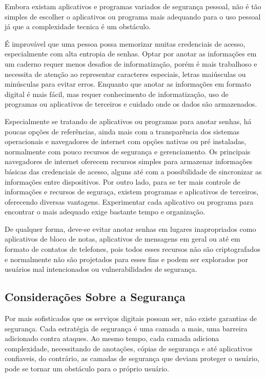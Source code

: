 \documentclass[12pt]{article}
\begin{document}
Embora existam aplicativos e programas variados de segurança pessoal, não é tão simples
de escolher o aplicativos ou programa mais adequando para o uso pessoal já que a
complexidade tecnica é um obstáculo.

É improvável que uma pessoa possa memorizar muitas credenciais de acesso, especialmente com
alta entropia de senhas.
Optar por anotar as informações em um caderno requer menos desafios de informatização, porém
é mais trabalhoso e necessita de atenção ao representar caracteres especiais, letras
maiúsculas ou minúsculas para evitar erros.
Enquanto que anotar as informações em formato digital é mais fácil, mas requer conhecimento
de informatização, uso de programas ou aplicativos de terceiros e cuidado onde os dados são
armazenados.

Especialmente se tratando de aplicativos ou programas para anotar senhas, há poucas
opções de referências, ainda mais com a transparência dos sistemas operacionais e
navegadores de internet com opções nativas ou pré instaladas, normalmente com pouco
recursos de segurança e gerenciamento.
Os principais navegadores de internet oferecem recursos simples para armazenar informações
básicas das credenciais de acesso, alguns até com a possibilidade de sincronizar as informações
entre dispositivos.
Por outro lado, para se ter mais controle de informações e recursos de seguraça, existem
programas e aplicativos de terceiros, oferecendo diversas vantagens.
Experimentar cada aplicativo ou programa para encontrar o mais adequado exige bastante tempo
e organização.

De qualquer forma, deve-se evitar anotar senhas em lugares inapropriados como aplicativos de
bloco de notas, aplicativos de mensagens em geral ou até em formato de contatos de telefones,
pois todos esses recursos não são criptografados e normalmente não são projetados para esses
fins e podem ser explorados por usuários mal intencionados ou vulnerabilidades de segurança.

\subsection{Considerações Sobre a Segurança}

Por mais sofisticados que os serviços digitais possam ser, não existe garantias de segurança.
Cada estratégia de segurança é uma camada a mais, uma barreira adicionado contra ataques.
Ao mesmo tempo, cada camada adiciona complexidade, necessitando de anotações, cópias de
segurança e até aplicativos confiaveis, do contrário, as camadas de segurança que deviam
proteger o usuário, pode se tornar um obstáculo para o próprio usuário.
\end{document}
